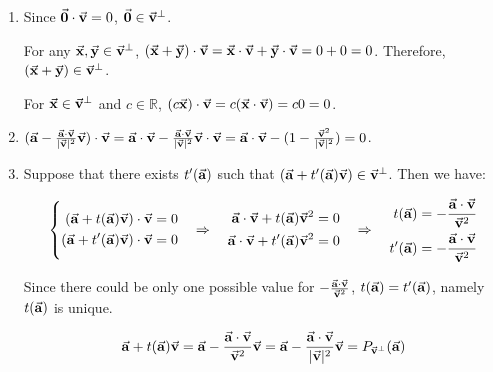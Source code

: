 \begin{exercise}{24}
  \def \Set {\Vect{v}^{\bot}}
  \begin{enumerate}
    \item Since $\vec{\mathbf{0}} \cdot \vec{\mathbf{v}} = 0$, $\Vect{0} \in \Set$.
    
          For any $\Vect{x}, \Vect{y} \in \Set$, $(\vec{\mathbf{x}} + \vec{\mathbf{y}}) \cdot \vec{\mathbf{v}} = \vec{\mathbf{x}} \cdot \vec{\mathbf{v}} + \vec{\mathbf{y}} \cdot \vec{\mathbf{v}} = 0 + 0 = 0$. Therefore, $(\Vect{x} + \Vect{y}) \in \Set$.
          
          For $\Vect{x} \in \Set$ and $c \in \mathbb{R}$, $(c\vec{\mathbf{x}}) \cdot \vec{\mathbf{v}} = c(\vec{\mathbf{x}} \cdot \vec{\mathbf{v}}) = c0 = 0$. \rQED
    
    \item $(\vec{\mathbf{a}} - \frac{\vec{\mathbf{a}} \cdot \vec{\mathbf{v}}}{|\vec{\mathbf{v}}|^2}\vec{\mathbf{v}}) \cdot \vec{\mathbf{v}} =
            \vec{\mathbf{a}} \cdot \vec{\mathbf{v}} - \frac{\vec{\mathbf{a}}\cdot\vec{\mathbf{v}}}{|\vec{\mathbf{v}}|^2}\vec{\mathbf{v}} \cdot \vec{\mathbf{v}} =
            \vec{\mathbf{a}} \cdot \vec{\mathbf{v}} - (1 - \frac{\vec{\mathbf{v}}^2}{|\vec{\mathbf{v}}|^2}) = 0$. \rQED
            
    \item Suppose that there exists $t'(\vec{\mathbf{a}})$ such that $(\Vect{a} + t'(\Vect{a})\Vect{v}) \in \Set$. Then we have:
    
         $$\left\{
         \begin{aligned}
            (\vec{\mathbf{a}} + t(\vec{\mathbf{a}})\vec{\mathbf{v}}) \cdot \vec{\mathbf{v}} = 0 \\
            (\vec{\mathbf{a}} + t'(\vec{\mathbf{a}})\vec{\mathbf{v}}) \cdot \vec{\mathbf{v}} = 0
         \end{aligned} \quad \Rightarrow \quad
         \begin{aligned}
            \vec{\mathbf{a}} \cdot \vec{\mathbf{v}} + t(\vec{\mathbf{a}})\vec{\mathbf{v}}^2 = 0 \\
            \vec{\mathbf{a}} \cdot \vec{\mathbf{v}} + t'(\vec{\mathbf{a}})\vec{\mathbf{v}}^2 = 0
         \end{aligned} \quad \Rightarrow \quad 
         \begin{aligned}
            t(\vec{\mathbf{a}}) = -\frac{\vec{\mathbf{a}} \cdot \vec{\mathbf{v}}}{\vec{\mathbf{v}}^2} \\
            t'(\vec{\mathbf{a}}) = -\frac{\vec{\mathbf{a}} \cdot \vec{\mathbf{v}}}{\vec{\mathbf{v}}^2}
         \end{aligned}
         \right.$$
         
         Since there could be only one possible value for $-\frac{\vec{\mathbf{a}} \cdot \vec{\mathbf{v}}}{\vec{\mathbf{v}}^2}$, $t(\vec{\mathbf{a}}) = t'(\vec{\mathbf{a}})$, namely $t(\vec{\mathbf{a}})$ is unique.
         
        $$\Vect{a} + t(\Vect{a})\Vect{v} = \Vect{a} -\frac{\Vect{a} \cdot \Vect{v}}{\Vect{v}^2}\Vect{v} = \Vect{a} - \frac{\Vect{a} \cdot \Vect{v}}{|\Vect{v}|^2}\Vect{v} = P_{\Set}(\Vect{a})$$
        
        \rQED
  \end{enumerate}
\end{exercise}

\begin{exercise}{26}
\end{exercise}
